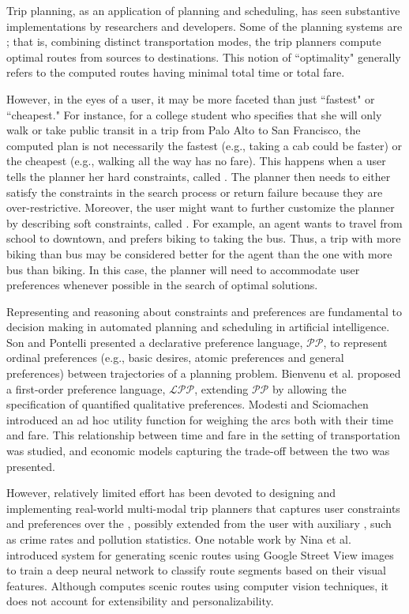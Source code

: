 Trip planning, as an application of planning and scheduling,
has seen substantive implementations by researchers and
developers\cite{bast2015route}.
Some of the planning systems are ; that is,
combining distinct transportation modes, the trip planners
compute optimal routes from sources to destinations.
This notion of ``optimality" generally refers to the computed routes
having minimal total time or total fare.

However, in the eyes of a user, it may be more faceted than just
``fastest" or ``cheapest."
For instance, for a college student who specifies that she will
only walk or take public transit in a trip from Palo Alto to
San Francisco, the computed plan is not necessarily the fastest
(e.g., taking a cab could be faster)
or the cheapest (e.g., walking all the way has no fare).
This happens when a user tells the planner her hard constraints,
called .  
The planner then needs to either satisfy the 
constraints in the search process or return failure because they are
over-restrictive.
Moreover, the user might want to further customize the planner by
describing soft constraints, called .
For example, an agent wants to travel from school to
downtown, and prefers biking to taking the bus.
Thus, a trip with more biking than bus may be considered better for
the agent than the one with more bus than biking.
In this case, the planner will need to accommodate user preferences
whenever possible in the search of optimal solutions.

Representing and reasoning about constraints and preferences are
fundamental to decision making in automated planning and scheduling
in artificial intelligence.
Son and Pontelli presented a declarative preference language, 
$\mathcal{PP}$, to represent ordinal preferences (e.g., basic desires,
atomic preferences and general preferences) between trajectories of 
a planning problem\cite{son2004planning}.
Bienvenu et al. proposed a first-order preference language, $\mathcal{LPP}$, 
extending $\mathcal{PP}$ by allowing the specification of quantified qualitative
preferences\cite{bienvenu2011specifying}.
Modesti and Sciomachen introduced an ad hoc utility function for weighing
the arcs both with their time and fare\cite{modesti1998utility}.
This relationship between time and fare in the setting of transportation
was studied, and economic models capturing the trade-off between the two
was presented\cite{antoniou2007methodology}.

However, relatively limited effort has been devoted to designing and
implementing real-world multi-modal trip planners that captures user
constraints and preferences over the , possibly
extended from the user with auxiliary ,
such as crime rates and pollution statistics.
One notable work by Nina et al.\cite{nina2016no} introduced
system  for generating scenic routes using
Google Street View images to train a deep neural network
to classify route segments based on their visual features.
Although  computes scenic routes using computer
vision techniques, it does not account for extensibility
and personalizability.

